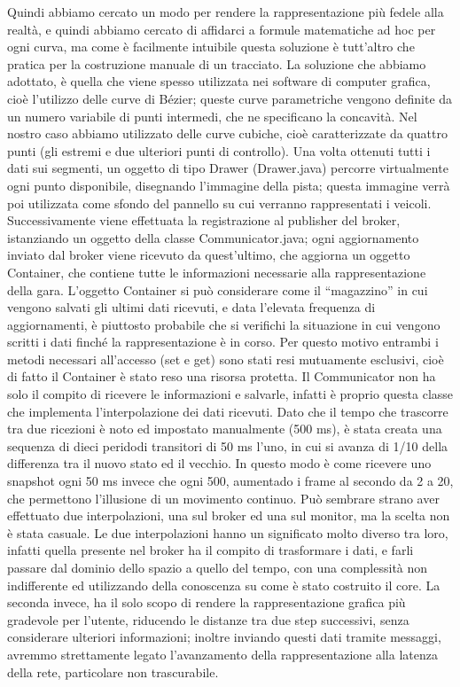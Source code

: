 Quindi abbiamo cercato un modo per rendere la rappresentazione più fedele alla realtà, e quindi abbiamo cercato di affidarci a formule matematiche ad hoc per ogni curva, ma come è facilmente intuibile questa soluzione è tutt’altro che pratica per la costruzione manuale di un tracciato.
La soluzione che abbiamo adottato, è quella che viene spesso utilizzata nei software di computer grafica, cioè l’utilizzo delle curve di Bézier; queste curve parametriche vengono definite da un numero variabile di punti intermedi, che ne specificano la concavità. Nel nostro caso abbiamo utilizzato delle curve cubiche, cioè caratterizzate da quattro punti (gli estremi e due ulteriori punti di controllo).
Una volta ottenuti tutti i dati sui segmenti, un oggetto di tipo Drawer (Drawer.java) percorre virtualmente ogni punto disponibile, disegnando l’immagine della pista; questa immagine verrà poi utilizzata come sfondo del pannello su cui verranno rappresentati i veicoli.
Successivamente viene effettuata la registrazione al publisher del broker, istanziando un oggetto della classe Communicator.java; ogni aggiornamento inviato dal broker viene ricevuto da quest’ultimo, che aggiorna un oggetto Container, che contiene tutte le informazioni necessarie alla rappresentazione della gara. L’oggetto Container si può considerare come il “magazzino” in cui vengono salvati gli ultimi dati ricevuti, e data l’elevata frequenza di aggiornamenti, è piuttosto probabile che si verifichi la situazione in cui vengono scritti i dati finché la rappresentazione è in corso. Per questo motivo entrambi i metodi necessari all’accesso (set e get) sono stati resi mutuamente esclusivi, cioè di fatto il Container è stato reso una risorsa protetta. 
Il Communicator non ha solo il compito di ricevere le informazioni e salvarle, infatti è proprio questa classe che implementa l’interpolazione dei dati ricevuti. Dato che il tempo che trascorre tra due ricezioni è noto ed impostato manualmente (500 ms), è stata creata una sequenza di dieci peridodi transitori di 50 ms l’uno, in cui si avanza di 1/10 della differenza tra il nuovo stato ed il vecchio. In questo modo è come ricevere uno snapshot ogni 50 ms invece che ogni 500, aumentado i frame al secondo da 2 a 20, che permettono l’illusione di un movimento continuo.
Può sembrare strano aver effettuato due interpolazioni, una sul broker ed una sul monitor, ma la scelta non è stata casuale. Le due interpolazioni hanno un significato molto diverso tra loro, infatti quella presente nel broker ha il compito di trasformare i dati, e farli passare dal dominio dello spazio a quello del tempo, con una complessità non indifferente ed utilizzando della conoscenza su come è stato costruito il core. La seconda invece, ha il solo scopo di rendere la rappresentazione grafica più gradevole per l’utente, riducendo le distanze tra due step successivi, senza considerare ulteriori informazioni; inoltre inviando questi dati tramite messaggi, avremmo strettamente legato l’avanzamento della rappresentazione alla latenza della rete, particolare non trascurabile.
